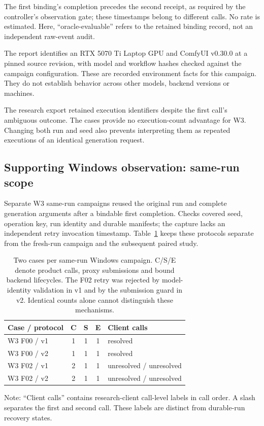 \documentclass{ieeeaccess}
\begin{document}
The first binding's completion precedes the second
receipt, as required by the controller's observation gate; these timestamps
belong to different calls. No rate is estimated. Here, ``oracle-evaluable''
refers to the retained binding record, not an independent raw-event audit.

The report identifies an RTX 5070 Ti Laptop GPU and ComfyUI v0.30.0 at a pinned source revision, with model and workflow hashes
checked against the campaign configuration. These are recorded environment
facts for this campaign. They do not establish behavior across other models,
backend versions or machines.

The research export retained execution identifiers despite the first call's
ambiguous outcome. The cases provide no execution-count advantage for
W3. Changing both run and seed also prevents interpreting them as repeated
executions of an identical generation request.

\subsection{Supporting Windows observation: same-run scope}

Separate W3 same-run campaigns reused the original run and complete generation
arguments after a bindable first completion. Checks covered seed, operation key,
run identity and durable manifests; the capture lacks an independent retry
invocation timestamp. Table~\ref{tab:samerun} keeps these protocols separate
from the fresh-run campaign and the subsequent paired study.

\begin{table}[t]
\caption{Two cases per same-run Windows campaign. C/S/E denote product calls,
proxy submissions and bound backend lifecycles. The F02 retry was rejected
by model-identity validation in v1 and by the submission guard in v2.
Identical counts alone cannot distinguish these mechanisms.}
\label{tab:samerun}
\centering
\begin{tabular}{lcccl}
\hline
Case / protocol & C & S & E & Client calls \\
\hline
W3 F00 / v1 & 1 & 1 & 1 & resolved \\
W3 F00 / v2 & 1 & 1 & 1 & resolved \\
W3 F02 / v1 & 2 & 1 & 1 & unresolved / unresolved \\
W3 F02 / v2 & 2 & 1 & 1 & unresolved / unresolved \\
\hline
\end{tabular}
\par\smallskip
\begin{minipage}{\columnwidth}\footnotesize\raggedright
Note: ``Client calls'' contains research-client call-level labels in call order.
A slash separates the first and second call. These labels are distinct from
durable-run recovery states.
\end{minipage}
\end{table}
\end{document}
